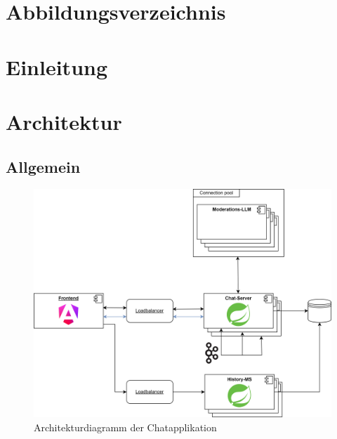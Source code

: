 \documentclass[12pt]{report}
\begin{document}
\renewcommand{\footrulewidth}{0.4pt} %


\renewcommand{\sectionmark}[1]{\markboth{#1}{}} 

\newpage


\tableofcontents
{}
\thispagestyle{plain}

\newpage
\chapter*{Abbildungsverzeichnis}

\listoffigures


\addtocounter{frontmatterPage}{\value{page}} 

\newpage
{}
\chapter{Einleitung}

\chapter{Architektur}

\section{Allgemein}
\begin{figure}[htbp]
	\centering
	\includegraphics[scale=0.125]{architektur}
	\caption{Architekturdiagramm der Chatapplikation}
	\label{fig:Architektur}
\end{figure}
\end{document}
